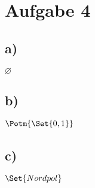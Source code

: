 \section*{Aufgabe 4}

\subsection*{a)}
$\varnothing$\\

\subsection*{b)}
$\Potm {\Set {0,1}} $\\

\subsection*{c)}
$\Set {Nordpol}$
